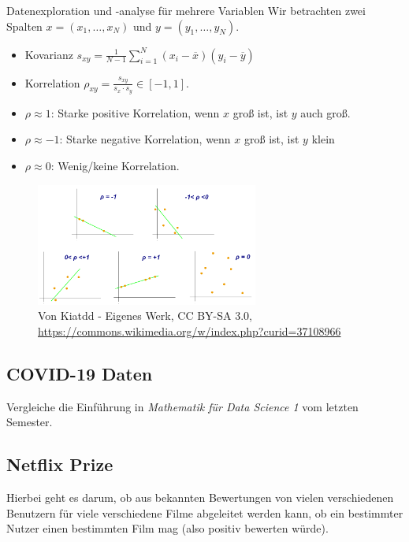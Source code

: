 \documentclass[]{book}
\theoremstyle{definition}
\theoremstyle{definition}
\theoremstyle{definition}
\theoremstyle{definition}
\theoremstyle{remark}
\begin{document}
Datenexploration und -analyse für mehrere Variablen Wir betrachten zwei
Spalten \(x = (x_1,\ldots,x_N)\) und \(y = (y_1,\ldots, y_N)\).

\begin{itemize}
\item
  Kovarianz
  \(s_{xy} = \frac{1}{N-1}\sum_{i=1}^N (x_i - \overline x)(y_i - \overline y)\)
\item
  Korrelation \(\rho_{xy} = \frac{s_{xy}}{s_x\cdot s_y} \in [-1,1]\).
\item
  \(\rho \approx 1\): Starke positive Korrelation, wenn \(x\) groß ist,
  ist \(y\) auch groß.
\item
  \(\rho \approx -1\): Starke negative Korrelation, wenn \(x\) groß ist,
  ist \(y\) klein
\item
  \(\rho \approx 0\): Wenig/keine Korrelation.
\end{itemize}

\begin{figure}
\centering
\includegraphics[width=0.65\textwidth,height=\textheight]{bilder/Correlation_coefficient.png}
\caption{Von Kiatdd - Eigenes Werk, CC BY-SA 3.0, \url{https://commons.wikimedia.org/w/index.php?curid=37108966}}
\end{figure}

\hypertarget{covid-19-daten}{%
\subsection{COVID-19 Daten}\label{covid-19-daten}}

Vergleiche die Einführung in \emph{Mathematik für Data Science 1} vom letzten Semester.

\hypertarget{netflix-prize}{%
\subsection{Netflix Prize}\label{netflix-prize}}

Hierbei geht es darum, ob aus bekannten Bewertungen von vielen verschiedenen Benutzern für viele verschiedene Filme abgeleitet werden kann, ob ein bestimmter Nutzer einen bestimmten Film mag (also positiv bewerten würde).
\end{document}
